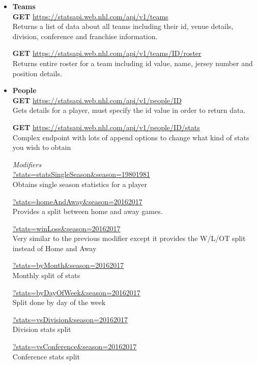 \documentclass[11pt]{article}
\begin{document}
    \begin{itemize}
        \item \textbf{Teams} \\
        \textbf{GET} \url{https://statsapi.web.nhl.com/api/v1/teams} \\
        Returns a list of data about all teams including their id, venue details, division, conference and franchise information.

        \textbf{GET} \url{https://statsapi.web.nhl.com/api/v1/teams/ID/roster} \\
        Returns entire roster for a team including id value, name, jersey number and position details.

        \item \textbf{People} \\
        \textbf{GET} \url{https://statsapi.web.nhl.com/api/v1/people/ID} \\
        Gets details for a player, must specify the id value in order to return data.

        \textbf{GET} \url{https://statsapi.web.nhl.com/api/v1/people/ID/stats} \\
        Complex endpoint with lots of append options to change what kind of stats you wish to obtain

        \textit{Modifiers} \\
        \url{?stats=statsSingleSeason&season=19801981} \\
        Obtains single season statistics for a player

        \url{?stats=homeAndAway&season=20162017} \\
        Provides a split between home and away games.

        \url{?stats=winLoss&season=20162017} \\
        Very similar to the previous modifier except it provides the W/L/OT split instead of Home and Away

        \url{?stats=byMonth&season=20162017} \\
        Monthly split of stats

        \url{?stats=byDayOfWeek&season=20162017} \\
        Split done by day of the week

        \url{?stats=vsDivision&season=20162017} \\
        Division stats split

        \url{?stats=vsConference&season=20162017} \\
        Conference stats split


\end{itemize}
\end{document}
